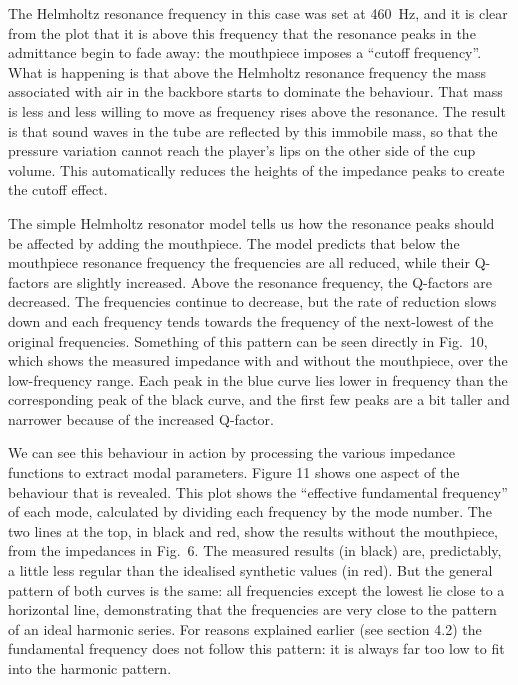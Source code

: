   The Helmholtz resonance frequency in this case was set at 460~Hz, and it is 
  clear from the plot that it is above this frequency that the resonance peaks 
  in the admittance begin to fade away: the mouthpiece imposes a “cutoff 
  frequency”. What is happening is that above the Helmholtz resonance frequency 
  the mass associated with air in the backbore starts to dominate the 
  behaviour. That mass is less and less willing to move as frequency rises 
  above the resonance. The result is that sound waves in the tube are reflected 
  by this immobile mass, so that the pressure variation cannot reach the 
  player’s lips on the other side of the cup volume. This automatically reduces 
  the heights of the impedance peaks to create the cutoff effect. 

  The simple Helmholtz resonator model tells us how the resonance peaks should 
  be affected by adding the mouthpiece. The model predicts that below the 
  mouthpiece resonance frequency the frequencies are all reduced, while their 
  Q-factors are slightly increased. Above the resonance frequency, the 
  Q-factors are decreased. The frequencies continue to decrease, but the rate 
  of reduction slows down and each frequency tends towards the frequency of the 
  next-lowest of the original frequencies. Something of this pattern can be 
  seen directly in Fig.\ 10, which shows the measured impedance with and 
  without the mouthpiece, over the low-frequency range. Each peak in the blue 
  curve lies lower in frequency than the corresponding peak of the black curve, 
  and the first few peaks are a bit taller and narrower because of the 
  increased Q-factor. 


  We can see this behaviour in action by processing the various impedance 
  functions to extract modal parameters. Figure 11 shows one aspect of the 
  behaviour that is revealed. This plot shows the “effective fundamental 
  frequency” of each mode, calculated by dividing each frequency by the mode 
  number. The two lines at the top, in black and red, show the results without 
  the mouthpiece, from the impedances in Fig.\ 6. The measured results (in 
  black) are, predictably, a little less regular than the idealised synthetic 
  values (in red). But the general pattern of both curves is the same: all 
  frequencies except the lowest lie close to a horizontal line, demonstrating 
  that the frequencies are very close to the pattern of an ideal harmonic 
  series. For reasons explained earlier (see section 4.2) the fundamental 
  frequency does not follow this pattern: it is always far too low to fit into 
  the harmonic pattern. 

